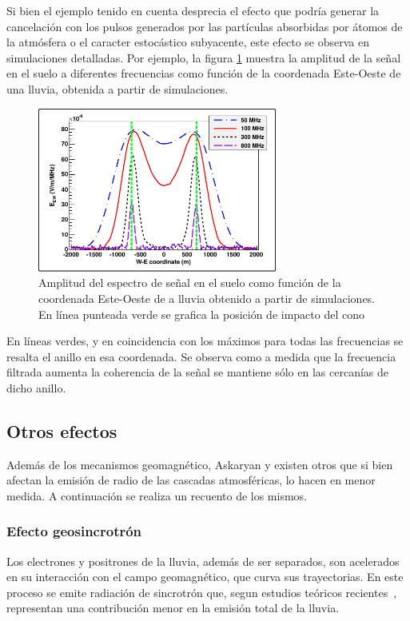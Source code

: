 	Si bien el ejemplo tenido en cuenta desprecia el efecto que podr\'ia generar la cancelaci\'on con los pulsos generados por las part\'iculas absorbidas por \'atomos de la atm\'osfera o el caracter estoc\'astico subyacente, este efecto se observa en simulaciones detalladas.
	Por ejemplo, la figura \ref{fig:chConeSig} muestra la amplitud de la señal en el suelo a diferentes frecuencias como función de la coordenada Este-Oeste de una lluvia, obtenida a partir de simulaciones.
	\begin{figure}[ht!]
	\centering
		\includegraphics[width=0.7\textwidth]{fig/EASRadio/chConeSig}
		\caption{\label{fig:chConeSig} Amplitud del espectro de se\~nal en el suelo como funci\'on de la coordenada Este-Oeste de a lluvia obtenido a partir de simulaciones. En l\'inea punteada verde se grafica la posici\'on de impacto del cono \cher{}}
	\end{figure}
	En l\'ineas verdes, y en coincidencia con los máximos para todas las frecuencias se resalta el anillo \cher{} en esa coordenada.
	Se observa como a medida que la frecuencia filtrada aumenta la coherencia de la se\~nal se mantiene sólo en las cercan\'ias de dicho anillo.
	
\subsection{Otros efectos}
\label{sbsc:other_emision}
	
	Adem\'as de los mecanismos geomagn\'etico, Askaryan y \cher{} existen otros que si bien afectan la emisi\'on de radio de las cascadas atmosf\'ericas, lo hacen en menor medida. 
	A continuaci\'on se realiza un recuento de los mismos.
	
	\subsubsection{Efecto geosincrotr\'on}
	Los electrones y positrones de la lluvia, adem\'as de ser separados, son acelerados en su interacci\'on con el campo geomagn\'etico, que curva sus trayectorias.
	En este proceso se emite radiaci\'on de sincrotr\'on que, segun estudios te\'oricos recientes~\cite{geosintrotron}, representan una contribuci\'on menor en la emisi\'on total de la lluvia.
	

